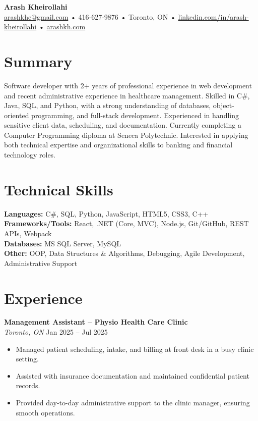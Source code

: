 \documentclass[letterpaper,8pt]{article}
\begin{document}

{\LARGE \textbf{Arash Kheirollahi}}\\
\href{mailto:arashkhe@gmail.com}{arashkhe@gmail.com} • 416-627-9876 • Toronto, ON • \href{https://linkedin.com/in/arash-kheirollahi}{linkedin.com/in/arash-kheirollahi} • \href{https://arashkh.com}{arashkh.com}

\vspace{1em}

\section*{Summary}
Software developer with 2+ years of professional experience in web development and recent administrative experience in healthcare management. Skilled in C\#, Java, SQL, and Python, with a strong understanding of databases, object-oriented programming, and full-stack development. Experienced in handling sensitive client data, scheduling, and documentation. Currently completing a Computer Programming diploma at Seneca Polytechnic. Interested in applying both technical expertise and organizational skills to banking and financial technology roles.

\section*{Technical Skills}
\textbf{Languages:} C\#, SQL, Python, JavaScript, HTML5, CSS3, C++ \\
\textbf{Frameworks/Tools:} React, .NET (Core, MVC), Node.js, Git/GitHub, REST APIs, Webpack \\
\textbf{Databases:} MS SQL Server, MySQL \\
\textbf{Other:} OOP, Data Structures \& Algorithms, Debugging, Agile Development, Administrative Support

\section*{Experience}
\textbf{Management Assistant – Physio Health Care Clinic}\\
\textit{Toronto, ON} \hfill Jan 2025 -- Jul 2025
\begin{itemize}[leftmargin=*]
  \item Managed patient scheduling, intake, and billing at front desk in a busy clinic setting.
  \item Assisted with insurance documentation and maintained confidential patient records.
  \item Provided day-to-day administrative support to the clinic manager, ensuring smooth operations.
\end{itemize}
\end{document}
